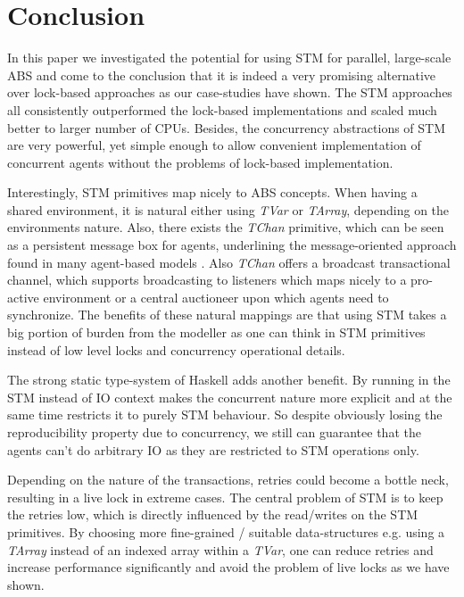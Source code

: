 \section{Conclusion} %
\label{sec:conclusion}

In this paper we investigated the potential for using STM for parallel, large-scale ABS and come to the conclusion that it is indeed a very promising alternative over lock-based approaches as our case-studies have shown. The STM approaches all consistently outperformed the lock-based implementations and scaled much better to larger number of CPUs. Besides, the concurrency abstractions of STM are very powerful, yet simple enough to allow convenient implementation of concurrent agents without the problems of lock-based implementation.

Interestingly, STM primitives map nicely to ABS concepts. When having a shared environment, it is natural either using \textit{TVar} or \textit{TArray}, depending on the environments nature. Also, there exists the \textit{TChan} primitive, which can be seen as a persistent message box for agents, underlining the message-oriented approach found in many agent-based models \cite{agha_actors:_1986, wooldridge_introduction_2009}. Also \textit{TChan} offers a broadcast transactional channel, which supports broadcasting to listeners which maps nicely to a pro-active environment or a central auctioneer upon which agents need to synchronize. The benefits of these natural mappings are that using STM takes a big portion of burden from the modeller as one can think in STM primitives instead of low level locks and concurrency operational details.

The strong static type-system of Haskell adds another benefit. By running in the STM instead of IO context makes the concurrent nature more explicit and at the same time restricts it to purely STM behaviour. So despite obviously losing the reproducibility property due to concurrency, we still can guarantee that the agents can't do arbitrary IO as they are restricted to STM operations only.

Depending on the nature of the transactions, retries could become a bottle neck, resulting in a live lock in extreme cases. The central problem of STM is to keep the retries low, which is directly influenced by the read/writes on the STM primitives. By choosing more fine-grained / suitable data-structures e.g. using a \textit{TArray} instead of an indexed array within a \textit{TVar}, one can reduce retries and increase performance significantly and avoid the problem of live locks as we have shown.

